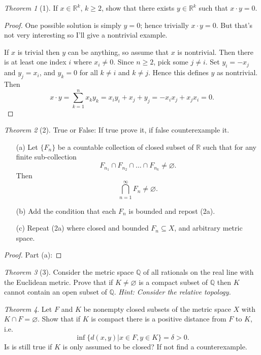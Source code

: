 \documentclass[12pt]{article}
\theoremstyle{remark}
\theoremstyle{named}
\newtheorem*{theorem}{Theorem}
\begin{document}
\begin{theorem}[1]
    If \(x \in \mathbb R^k\), \(k \ge 2\), show that there exists \(y \in \mathbb R^k\) such that \(x \cdot y = 0\).
\end{theorem}

\begin{proof}
    One possible solution is simply \(y = 0\); hence trivially \(x \cdot y = 0\). But that's not very interesting so I'll give a nontrivial example.

    If \(x\) is trivial then \(y\) can be anything, so assume that \(x\) is nontrivial. Then there is at least one index \(i\) where \(x_i \neq 0\). Since \(n \ge 2\), pick some \(j \neq i\). Set \(y_i = -x_j\) and \(y_j = x_i\), and \(y_k = 0\) for all \(k \neq i\) and \(k \neq j\). Hence this defines \(y\) as nontrivial. Then 
    \[x \cdot y = \sum_{k = 1}^n x_k y_k = x_i y_i + x_j + y_j = - x_i x_j + x_j x_i = 0.\]
\end{proof}

\begin{theorem}[2]
    True or False: If true prove it, if false counterexample it.
    \begin{enumerate}
        \item [(a)] Let \(\{F_n\}\) be a countable collection of closed subset of \(\mathbb R\) such that for any finite sub-collection 
        \[F_{n_1} \cap F_{n_2} \cap \dots \cap F_{n_k} \neq \varnothing.\]
        Then 
        \[\bigcap_{n = 1}^\infty F_n \neq \varnothing.\]
        \item [(b)] Add the condition that each \(F_n\) is bounded and repost (2a).
        \item [(c)] Repeat (2a) where closed and bounded \(F_n \subseteq X\), and arbitrary metric space.
    \end{enumerate}
\end{theorem}

\begin{proof}
    Part (a):
\end{proof}

\begin{theorem}[3]
    Consider the metric space \(\mathbb Q\) of all rationals on the real line with the Euclidean metric. Prove that if \(K \neq \varnothing\) is a compact subset of \(\mathbb Q\) then \(K\) cannot contain an open subset of \(\mathbb Q\). \textit{Hint: Consider the relative topology.}
\end{theorem}

\begin{theorem}
    Let \(F\) and \(K\) be nonempty closed subsets of the metric space \(X\) with \(K \cap F = \varnothing\). Show that if \(K\) is compact there is a positive distance from \(F\) to \(K\), i.e.
    \[\inf\{d(x, y) | x \in F, y \in K\} = \delta > 0.\]
    Is is still true if \(K\) is only assumed to be closed? If not find a counterexample.
\end{theorem}
\end{document}
